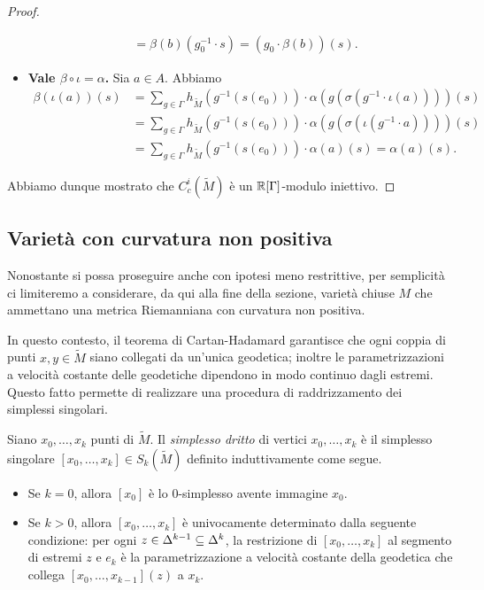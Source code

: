 \begin{proof}
\begin{itemize}
\begin{align*}
&=\beta(b)(g_0^{-1}\cdot s)=(g_0\cdot\beta(b))(s).
\end{align*}
\item \textbf{Vale $\beta\circ\iota=\alpha$.} Sia $a\in A$. Abbiamo
\begin{align*}
\beta(\iota(a))(s)&=\sum_{g\in\Gamma}h_{\widetilde M}(g^{-1}(s(e_0)))\cdot \alpha(g(\sigma(g^{-1}\cdot\iota(a))))(s)\\
&=\sum_{g\in\Gamma}h_{\widetilde M}(g^{-1}(s(e_0)))\cdot \alpha(g(\sigma(\iota(g^{-1}\cdot a))))(s)\\
&=\sum_{g\in\Gamma}h_{\widetilde M}(g^{-1}(s(e_0)))\cdot \alpha(a)(s)=\alpha(a)(s).
\end{align*}
\end{itemize}
Abbiamo dunque mostrato che $C^i_c(\widetilde M)$ è un $\mathbb{R}[\Gamma]$-modulo iniettivo.
\end{proof}

\subsection{Varietà con curvatura non positiva}
Nonostante si possa proseguire anche con ipotesi meno restrittive, per semplicità ci limiteremo a considerare, da qui alla fine della sezione, varietà chiuse $M$ che ammettano una metrica Riemanniana con curvatura non positiva.

In questo contesto, il teorema di Cartan-Hadamard garantisce che ogni coppia di punti $x,y\in\widetilde M$ siano collegati da un'unica geodetica; inoltre le parametrizzazioni a velocità costante delle geodetiche dipendono in modo continuo dagli estremi. Questo fatto permette di realizzare una procedura di raddrizzamento dei simplessi singolari.

\begin{definition}
Siano $x_0,\ldots,x_k$ punti di $\widetilde M$. Il \emph{simplesso dritto} di vertici $x_0,\ldots,x_k$ è il simplesso singolare $[x_0,\ldots,x_k]\in S_k(\widetilde M)$ definito induttivamente come segue.
\begin{itemize}
\item Se $k=0$, allora $[x_0]$ è lo $0$-simplesso avente immagine $x_0$.
\item Se $k>0$, allora $[x_0,\ldots,x_k]$ è univocamente determinato dalla seguente condizione: per ogni $z\in\Delta^{k-1}\subseteq\Delta^k$, la restrizione di $[x_0,\ldots,x_k]$ al segmento di estremi $z$ e $e_k$ è la parametrizzazione a velocità costante della geodetica che collega $[x_0,\ldots,x_{k-1}](z)$ a $x_k$.
\end{itemize}
\end{definition}

